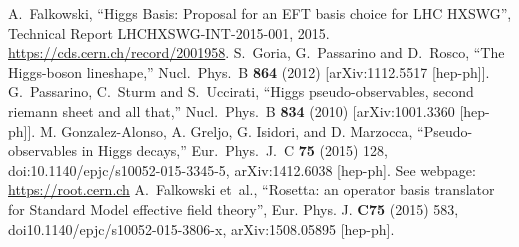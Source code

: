 \documentclass[aps,superscriptaddress,nofootinbib]{revtex4}
\begin{document}
\begin{thebibliography}{99}
{A.~Falkowski, ``{Higgs Basis: Proposal for an EFT basis choice
  for LHC HXSWG}'',} Technical Report LHCHXSWG-INT-2015-001, 2015.
\newblock \url{https://cds.cern.ch/record/2001958}.
  S.~Goria, G.~Passarino and D.~Rosco,
  ``The Higgs-boson lineshape,''
  Nucl.\ Phys.\ B  {\bf 864} (2012)
  [arXiv:1112.5517 [hep-ph]].
  G.~Passarino, C.~Sturm and S.~Uccirati,
  ``Higgs pseudo-observables, second riemann sheet and all that,''
  Nucl.\ Phys.\ B {\bf 834} (2010)
  [arXiv:1001.3360 [hep-ph]].
  M. Gonzalez-Alonso, A. Greljo, G. Isidori, and D. Marzocca, ``Pseudo-observables in
  Higgs decays,'' Eur.\ Phys.\ J.\ C {\bf 75} (2015) 128,
  doi:10.1140/epjc/s10052-015-3345-5, arXiv:1412.6038 [hep-ph].
See webpage: \url{https://root.cern.ch}
A.~Falkowski {et~al.}, ``{Rosetta: an operator basis translator for Standard Model effective field theory}'',
 { Eur. Phys. J.}  {\bf C75} (2015) 583,
 doi{10.1140/epjc/s10052-015-3806-x}, arXiv:1508.05895 [hep-ph].
\end{thebibliography}
\end{document}
